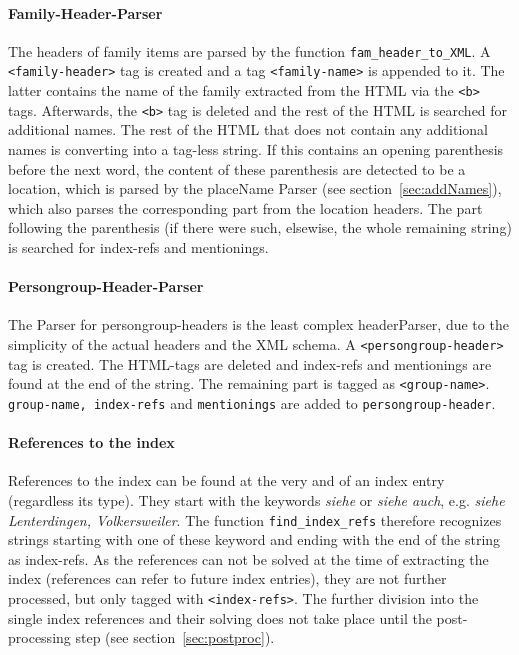 \paragraph{Family-Header-Parser}
The headers of family items are parsed by the function \texttt{fam\_header\_to\_XML}. A \texttt{<family-header>} tag is created and a tag \texttt{<family-name>} is appended to it. The latter contains the name of the family extracted from the HTML via the \texttt{<b>} tags. Afterwards, the \texttt{<b>} tag is deleted and the rest of the HTML is searched for additional names. The rest of the HTML that does not contain any additional names is converting into a tag-less string. If this contains an opening parenthesis before the next word, the content of these parenthesis are detected to be a location, which is parsed by the placeName Parser (see section~\ref{sec:addNames}), which also parses the corresponding part from the location headers. The part following the parenthesis (if there were such, elsewise, the whole remaining string) is searched for index-refs and mentionings.

\paragraph{Persongroup-Header-Parser}
The Parser for persongroup-headers is the least complex headerParser, due to the simplicity of the actual headers and the XML schema. A \texttt{<persongroup-header>} tag is created. The HTML-tags are deleted and index-refs and mentionings are found at the end of the string. The remaining part is tagged as \texttt{<group-name>}. \texttt{group-name, index-refs} and \texttt{mentionings} are added to \texttt{persongroup-header}.

\paragraph{References to the index}
\label{sec:index-refs}
References to the index can be found at the very and of an index entry (regardless its type). They start with the keywords \textit{siehe} or \textit{siehe auch}, e.g. \textit{siehe Lenterdingen, Volkersweiler}. The function \texttt{find\_index\_refs} therefore recognizes strings starting with one of these keyword and ending with the end of the string as index-refs. As the references can not be solved at the time of extracting the index (references can refer to future index entries), they are not further processed, but only tagged with \texttt{<index-refs>}. The further division into the single index references and their solving does not take place until the post-processing step (see section~\ref{sec:postproc}).

